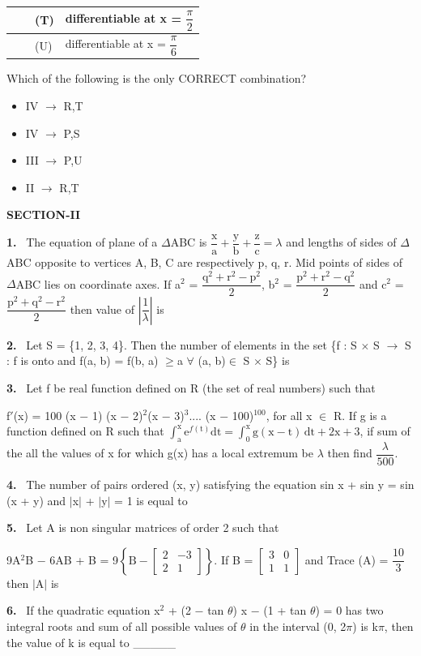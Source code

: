 \documentclass[10pt]{extarticle}
\newcommand{\sect}[1]{\par\smallskip\noindent\textbf{#1}\par}
\newcommand{\qn}[1]{\par\smallskip\noindent\textbf{#1.}~}
\newenvironment{qoptions}{\begin{itemize}[leftmargin=1.8em,itemsep=1pt,topsep=2pt,label={}]}{\end{itemize}}
\newcommand{\opt}[2]{\item[(#1)] #2}
\begin{document}
\begin{multicols}{2}
{\begin{tabular}{|l|L{3.4cm}|l|L{2.7cm}|}
 & & (T) & differentiable at x = $\dfrac{\pi}{2}$\\ \hline
 & & (U) & differentiable at x = $\dfrac{\pi}{6}$\\ \hline
\end{tabular}}\par
Which of the following is the only CORRECT combination?
\begin{qoptions}
\opt{A}{IV $\longrightarrow$ R,T}
\opt{B}{IV $\longrightarrow$ P,S}
\opt{C}{III $\longrightarrow$ P,U}
\opt{D}{II $\longrightarrow$ R,T}
\end{qoptions}
\sect{SECTION-II}
\qn{1} The equation of plane of a $\Delta$ABC is $\dfrac{\text{x}}{\text{a}}+\dfrac{\text{y}}{\text{b}}+\dfrac{\text{z}}{\text{c}}=\lambda$ and lengths of sides of $\Delta$ABC opposite to vertices A, B, C are respectively p, q, r. Mid points of sides of $\Delta$ABC lies on coordinate axes. If a$^2$ = $\dfrac{\text{q}^2+\text{r}^2-\text{p}^2}{2}$, b$^2$ = $\dfrac{\text{p}^2+\text{r}^2-\text{q}^2}{2}$ and c$^2$ = $\dfrac{\text{p}^2+\text{q}^2-\text{r}^2}{2}$ then value of $\left|\dfrac{1}{\lambda}\right|$ is
\qn{2} Let S = \{1, 2, 3, 4\}. Then the number of elements in the set \{f : S $\times$ S $\longrightarrow$ S : f is onto and f(a, b) = f(b, a) $\geq$a $\forall$ (a, b)$\in$ S $\times$ S\} is
\qn{3} Let f be real function defined on R (the set of real numbers) such that\par
f$'$(x) = 100 (x $-$ 1) (x $-$ 2)$^2$(x $-$ 3)$^3$.... (x $-$ 100)$^{100}$, for all x $\in$ R. If g is a function defined on R such that $\displaystyle\int_\text{a}^\text{x}\text{e}^{f(\text{t})}\text{dt}=\int_0^\text{x}\text{g}(\text{x}-\text{t})\,\text{dt}+2\text{x}+3$, if sum of the all the values of x for which g(x) has a local extremum be $\lambda$ then find $\dfrac{\lambda}{500}$.
\qn{4} The number of pairs ordered (x, y) satisfying the equation sin x + sin y = sin (x + y) and $|$x$|$ + $|$y$|$ = 1 is equal to
\qn{5} Let A is non singular matrices of order 2 such that\par
9A$^2$B $-$ 6AB + B = 9$\left\{\text{B}-\begin{bmatrix}2&-3\\2&1\end{bmatrix}\right\}$. If B = $\begin{bmatrix}3&0\\1&1\end{bmatrix}$ and Trace (A) = $\dfrac{10}{3}$ then $|$A$|$ is
\qn{6} If the quadratic equation x$^2$ + (2 $-$ tan $\theta$) x $-$ (1 + tan $\theta$) = 0 has two integral roots and sum of all possible values of $\theta$ in the interval (0, 2$\pi$) is k$\pi$, then the value of k is equal to \_\_\_\_\_
\end{multicols}
\end{document}
